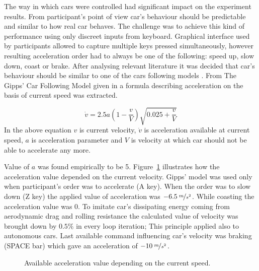 \documentclass[11pt,english]{article}
\begin{document}
The way in which cars were controlled had significant impact on the experiment results. From participant's point of view car's behaviour should be predictable and similar to how real car behaves. The challenge was to achieve this kind of performance using only discreet inputs from keyboard. Graphical interface used by participants allowed to capture multiple keys pressed simultaneously, however resulting acceleration order had to always be one of the following: speed up, slow down, coast or brake. After analysing relevant literature it was decided that car's behaviour should be similar to one of the cars following models \citep{treiber2013traffic}. From The Gipps' Car Following Model given in \citet{spyropoulou2007simulation} a formula describing acceleration on the basis of current speed was extracted.

\begin{equation}
\dot{v}=2.5a(1- \frac{v}{V})\sqrt{0.025+ \frac{v}{V}}
\end{equation}
In the above equation $v$ is current velocity, $\dot{v}$ is acceleration available at current speed, $a$ is acceleration parameter and $V$ is velocity at which car should not be able to accelerate any more.

Value of $a$ was found empirically to be 5. Figure~\ref{fig:gipps} illustrates how the acceleration value depended on the current velocity. Gipps' model was used only when participant's order was to accelerate (A key). When the order was to slow down (Z key) the applied value of acceleration was $-6.5\:\nicefrac{m}{s^2}$. While coasting the acceleration value was $0$. To imitate car's dissipating energy coming from aerodynamic drag and rolling resistance the calculated value of velocity was brought down by $0.5\%$ in every loop iteration; This principle applied also to autonomous cars. Last available command influencing car's velocity was braking (SPACE bar) which gave an acceleration of $-10\:\nicefrac{m}{s^2}$.


\begin{figure}[!] %
\caption{Available acceleration value depending on the current speed.}
\label{fig:gipps}
\end{figure} 
\end{document}
